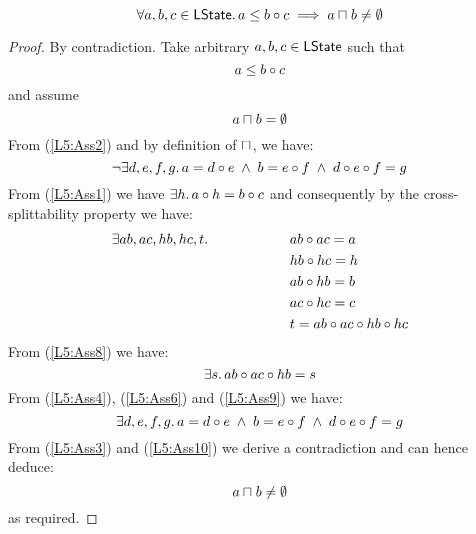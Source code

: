 %
%

%

%
%
\begin{lemma}[]\label{lem:nonEmptyOverlap}
%
\[
	\forall a, b, c \in \textsf{LState}.\, a \leq b \circ c \implies a \sqcap_{} b \not= \emptyset
\]
%
\begin{proof} By contradiction.
Take arbitrary $a, b, c \in \textsf{LState}$ such that 
%
\begin{equation}
	a \leq b \circ c \label{L5:Ass1}
\end{equation}
%
and assume
%
\begin{equation}
	a \sqcap_{} b = \emptyset \label{L5:Ass2}
\end{equation}
%
From (\ref{L5:Ass2}) and by definition of $\sqcap_{}$, we have:
%
\begin{equation}
	\neg\exists d, e, f, g.\, a = d \circ e \;\land\; b = e \circ f \;\land\; d \circ e \circ f = g \label{L5:Ass3}
\end{equation}
%
From (\ref{L5:Ass1}) we have $\exists h.\, a \circ h = b \circ c$ and consequently by the cross-splittability property we have:
%
\begin{align}
	\exists ab, ac, hb, hc, t.\, \hspace*{2cm}&
	ab \circ ac = a 	\label{L5:Ass4}\\
	& hb \circ hc = h \label{L5:Ass5}\\
	& ab \circ hb = b \label{L5:Ass6}\\
	& ac \circ hc = c \label{L5:Ass7}\\
	& t = ab \circ ac \circ hb \circ hc \label{L5:Ass8}
\end{align}
%
From (\ref{L5:Ass8}) we have:
%
\begin{equation}
	\exists s.\, ab \circ ac \circ hb = s \label{L5:Ass9}
\end{equation}
%
From (\ref{L5:Ass4}), (\ref{L5:Ass6}) and (\ref{L5:Ass9}) we have: 
%
\begin{equation}
	\exists d, e, f, g.\, a = d \circ e \;\land\; b = e \circ f \;\land\; d \circ e \circ f = g \label{L5:Ass10}
\end{equation}
%
From (\ref{L5:Ass3}) and (\ref{L5:Ass10}) we derive a contradiction and can hence deduce:
%
\begin{equation}
	a \sqcap_{} b \not= \emptyset \nonumber
\end{equation}
%
as required.
\end{proof}
\end{lemma}
